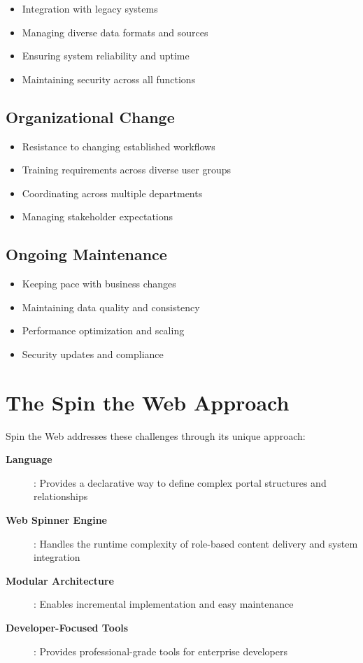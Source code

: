 \begin{itemize}
	\item Integration with legacy systems
	\item Managing diverse data formats and sources
	\item Ensuring system reliability and uptime
	\item Maintaining security across all functions
\end{itemize}

\subsection{Organizational Change}

\begin{itemize}
	\item Resistance to changing established workflows
	\item Training requirements across diverse user groups
	\item Coordinating across multiple departments
	\item Managing stakeholder expectations
\end{itemize}

\subsection{Ongoing Maintenance}

\begin{itemize}
	\item Keeping pace with business changes
	\item Maintaining data quality and consistency
	\item Performance optimization and scaling
	\item Security updates and compliance
\end{itemize}

\section{The Spin the Web Approach}
\label{sec:spin-approach}

Spin the Web addresses these challenges through its unique approach:

\begin{description}
\item[\textbf{\wbdl{} Language}]: Provides a declarative way to define complex portal structures and relationships
\item[\textbf{Web Spinner Engine}]: Handles the runtime complexity of role-based content delivery and system integration
\item[\textbf{Modular Architecture}]: Enables incremental implementation and easy maintenance
\item[\textbf{Developer-Focused Tools}]: Provides professional-grade tools for enterprise developers
\end{description}

